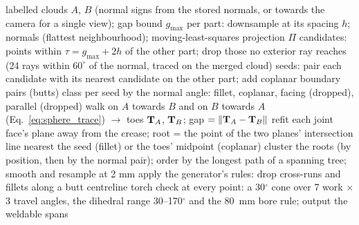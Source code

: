 \begin{algorithm}[htbp]
\caption{Matching and sphere-tracing seam extraction}
\label{alg:ws_seamfind}
\begin{algorithmic}[1]
\REQUIRE labelled clouds $A$, $B$ (normal signs from the stored normals, or towards the camera for a single view); gap bound $g_{\max}$
\STATE per part: downsample at its spacing $h$; normals (flattest neighbourhood); moving-least-squares projection $\Pi$
\STATE candidates: points within $\tau=g_{\max}+2h$ of the other part; drop those no exterior ray reaches (24 rays within $60^\circ$ of the normal, traced on the merged cloud)
\STATE seeds: pair each candidate with its nearest candidate on the other part; add coplanar boundary pairs (butts)
\STATE class per seed by the normal angle: fillet, coplanar, facing (dropped), parallel (dropped)
  \STATE walk on $A$ towards $B$ and on $B$ towards $A$ (Eq.~\ref{eq:sphere_trace}) $\to$ toes $\mathbf{T}_A$, $\mathbf{T}_B$; gap $=\left\lVert\mathbf{T}_A-\mathbf{T}_B\right\rVert$
  \STATE refit each joint face's plane away from the crease; root = the point of the two planes' intersection line nearest the seed (fillet) or the toes' midpoint (coplanar)
\ENDFOR
\STATE cluster the roots (by position, then by the normal pair); order by the longest path of a spanning tree; smooth and resample at 2 mm
\STATE apply the generator's rules: drop cross-runs and fillets along a butt centreline
\STATE torch check at every point: a 30$^\circ$ cone over 7 work $\times$ 3 travel angles, the dihedral range 30--170$^\circ$ and the 80~mm bore rule; output the weldable spans
\end{algorithmic}
\end{algorithm}

